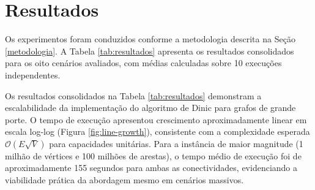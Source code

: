 \documentclass[12pt]{article}
\begin{document}
\section{Resultados} \label{resultados}

Os experimentos foram conduzidos conforme a metodologia descrita na Seção \ref{metodologia}. A Tabela \ref{tab:resultados} apresenta os resultados consolidados para os oito cenários avaliados, com médias calculadas sobre 10 execuções independentes.

\begin{table}[ht]
\centering
\caption{Desempenho médio do Dinic por tipo de conectividade.}
\label{tab:resultados}
\end{table}

Os resultados consolidados na Tabela \ref{tab:resultados} demonstram a escalabilidade da implementação do algoritmo de Dinic para grafos de grande porte. O tempo de execução apresentou crescimento aproximadamente linear em escala log-log (Figura \ref{fig:line-growth}), consistente com a complexidade esperada $\mathcal{O}(E \sqrt{V})$ para capacidades unitárias. Para a instância de maior magnitude (1 milhão de vértices e 100 milhões de arestas), o tempo médio de execução foi de aproximadamente 155 segundos para ambas as conectividades, evidenciando a viabilidade prática da abordagem mesmo em cenários massivos.
\end{document}
